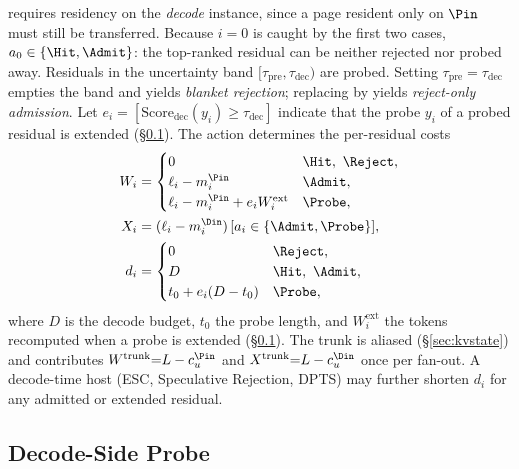 \noindent
\Hit requires residency on the \emph{decode} instance, since a page resident only on $\Pin$ must still be transferred.
Because $i{=}0$ is caught by the first two cases, $a_0\in\{\Hit,\Admit\}$: the top-ranked residual can be neither rejected nor probed away.
Residuals in the uncertainty band $[\tau_{\mathrm{pre}},\tau_{\mathrm{dec}})$ are probed.
Setting $\tau_{\mathrm{pre}}{=}\tau_{\mathrm{dec}}$ empties the band and yields \emph{blanket rejection}; replacing \Probe by \Admit yields \emph{reject-only admission}.
Let $e_i{=}[\mathrm{Score}_{\mathrm{dec}}(y_i)\ge\tau_{\mathrm{dec}}]$ indicate that the probe $y_i$ of a probed residual is extended (\S\ref{sec:split}).
The action determines the per-residual costs
\begin{align}
W_i &=
\begin{cases}
0 & \Hit,\ \Reject,\\
\ell_i-m_i^{\Pin} & \Admit,\\
\ell_i-m_i^{\Pin}+e_iW_i^{\mathrm{ext}} & \Probe,
\end{cases}
\label{eq:work}\\
X_i &= (\ell_i-m_i^{\Din})\,[a_i\in\{\Admit,\Probe\}],
\label{eq:xfer}\\
d_i &=
\begin{cases}
0 & \Reject,\\
D & \Hit,\ \Admit,\\
t_0+e_i(D-t_0) & \Probe,
\end{cases}
\label{eq:dec}
\end{align}
where $D$ is the decode budget, $t_0$ the probe length, and $W_i^{\mathrm{ext}}$ the tokens recomputed when a probe is extended (\S\ref{sec:split}).
The trunk is aliased (\S\ref{sec:kvstate}) and contributes $W^{\mathrm{trunk}}{=}L-c_u^{\Pin}$ and $X^{\mathrm{trunk}}{=}L-c_u^{\Din}$ once per fan-out.
A decode-time host (ESC, Speculative Rejection, DPTS) may further shorten $d_i$ for any admitted or extended residual.

\subsection{Decode-Side Probe}
\label{sec:split}

